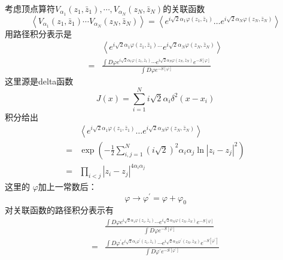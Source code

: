 考虑顶点算符$ V_{\alpha_{1}}\left(z_{1}, \bar{z}_{1}\right), \cdots, V_{\alpha_{N}}\left(z_{N}, \bar{z}_{N}\right) $的关联函数
$$
	\left\langle V_{\alpha_{1}}\left(z_{1}, \bar{z}_{1}\right) \cdots V_{\alpha_{N}}\left(z_{N}, \bar{z}_{N}\right)\right\rangle=\left\langle e^{i \sqrt{2} \alpha_{1} \varphi\left(z_{1}, \bar{z}_{1}\right)} \ldots e^{i \sqrt{2} \alpha_{N} \varphi\left(z_{N}, \bar{z}_{N}\right)}\right\rangle
$$
用路径积分表示是
\begin{equation}
\begin{aligned} &\left\langle e^{i \sqrt{2} \alpha_{1} \varphi\left(z_{1}, \bar{z}_{1}\right) \ldots} e^{i \sqrt{2} \alpha_{N} \varphi\left(z_{N}, \bar{z}_{N}\right)}\right\rangle \\ =& \frac{\int D \varphi e^{i \sqrt{2} \alpha_{1} \varphi\left(z_{1}, \bar{z}_{1}\right)} \cdots e^{i \sqrt{2} \alpha_{N} \varphi\left(z_{N}, \bar{z}_{N}\right)} e^{-S[\varphi]}}{\int D \varphi e^{-S[\varphi]}} \end{aligned}
\end{equation}
这里源是delta函数
\begin{equation}
	J(x)=\sum_{i=1}^{N} i \sqrt{2} \alpha_{i} \delta^{2}\left(x-x_{i}\right)
\end{equation}
积分给出
\begin{equation}
\begin{aligned} &\left\langle e^{i \sqrt{2} \alpha_{1} \varphi\left(z_{1}, \bar{z}_{1}\right)} \ldots e^{i \sqrt{2} \alpha_{N} \varphi\left(z_{N}, \bar{z}_{N}\right)}\right\rangle \\ =& \exp \left(-\frac{1}{2} \sum_{i, j=1}^{N}(i \sqrt{2})^{2} \alpha_{i} \alpha_{j} \ln \left|z_{i}-z_{j}\right|^{2}\right) \\ =& \prod_{i<j}\left|z_{i}-z_{j}\right|^{4 \alpha_{i} \alpha_{j}} \end{aligned}
\end{equation}
这里的 $\varphi $加上一常数后：
\begin{equation}
	\varphi \rightarrow \varphi^{\prime}=\varphi+\varphi_{0}
\end{equation}
对关联函数的路径积分表示有
\begin{equation}
	\begin{aligned} & \frac{\int D \varphi e^{i \sqrt{2} \alpha_{1} \varphi\left(z_{1}, \bar{z}_{1}\right)} \cdots e^{i \sqrt{2} \alpha_{N} \varphi\left(z_{N}, \bar{z}_{N}\right)} e^{-S[\varphi]}}{\int D \varphi e^{-S[\varphi]}} \\ =& \frac{\int D \varphi^{\prime} e^{i \sqrt{2} \alpha_{1} \varphi^{\prime}\left(z_{1}, \bar{z}_{1}\right)} \cdots e^{i \sqrt{2} \alpha_{N} \varphi^{\prime}\left(z_{N}, \bar{z}_{N}\right)} e^{-S\left[\varphi^{\prime}\right]}}{\int D \varphi^{\prime} e^{-S\left[\varphi^{\prime}\right]}} \end{aligned}
\end{equation}
